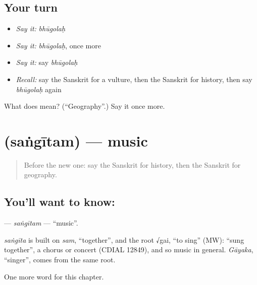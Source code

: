 \subsection*{Your turn}
\begin{itemize}
\raggedright
  \item \emph{Say it:} \emph{bhūgolaḥ}
  \item \emph{Say it:} \emph{bhūgolaḥ}, once more
  \item \emph{Say it:} say \emph{bhūgolaḥ}
  \item \emph{Recall:} say the Sanskrit for a vulture, then the Sanskrit for history, then say \emph{bhūgolaḥ} again
\end{itemize}

\begin{tcolorbox}[breakable,colback=teal!4,colframe=teal!35!black,title={Before you move on}]
What does  mean? (\textquotedblleft{}Geography\textquotedblright{}.) Say it once more.
\end{tcolorbox}
\section[\texorpdfstring{\sk{संगीतम्} (saṅgītam)}{संगीतम् (saṅgītam)}]{ (saṅgītam) — music}

\label{lesson:SA-C228-sangitam}



\begin{quote}
Before the new one: say the Sanskrit for history, then the Sanskrit for geography.
\end{quote}

\subsection*{You'll want to know: }
\textbf{} — \emph{saṅgītam} — \textquotedblleft{}music\textquotedblright{}.

\begin{cousinweb}
\emph{saṅgīta} is built on \emph{sam}, \textquotedblleft{}together\textquotedblright{}, and the root √gai, \textquotedblleft{}to sing\textquotedblright{} (MW): \textquotedblleft{}sung together\textquotedblright{}, a chorus or concert (CDIAL 12849), and so music in general. \emph{Gāyaka}, \textquotedblleft{}singer\textquotedblright{}, comes from the same root.
\end{cousinweb}

\begin{grammarlens}[title={What you've built}]
One more word for this chapter.
\end{grammarlens}

